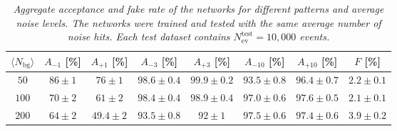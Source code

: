 \begingroup

\renewcommand{\arraystretch}{1.5}
\begin{table}[h]
\centering
\small
\begin{tabular}{cccccccc}
\toprule
\textbf{$\langle{N_{\text{bg}}}\rangle$} & 
\textbf{$A_{-1}$ [\%]} & 
\textbf{$A_{+1}$ [\%]} & 
\textbf{$A_{-3}$ [\%]} & 
\textbf{$A_{+3}$ [\%]} & 
\textbf{$A_{-10}$ [\%]} & 
\textbf{$A_{+10}$ [\%]} & 
\textbf{$F$ [\%]} \\
\midrule
$50$  & $86 \pm 1$   & $76 \pm 1$   & $98.6 \pm 0.4$ & $99.9 \pm 0.2$ & $93.5 \pm 0.8$ & $96.4 \pm 0.7$ & $2.2 \pm 0.1$ \\
$100$ & $70 \pm 2$   & $61 \pm 2$   & $98.4 \pm 0.4$ & $98.9 \pm 0.4$ & $97.0 \pm 0.6$ & $97.6 \pm 0.5$ & $2.1 \pm 0.1$ \\
$200$ & $64 \pm 2$   & $49.4 \pm 2$ & $93.5 \pm 0.8$ & $92 \pm 1$     & $97.5 \pm 0.6$ & $97.4 \pm 0.6$ & $3.9 \pm 0.2$ \\
\bottomrule
\end{tabular}
\vspace{3mm}
\caption{\emph{Aggregate acceptance and fake rate of the networks for different patterns and average noise levels. The networks were trained and tested with the same average number of noise hits. Each test dataset contains $N_{\text{ev}}^{\text{test}} = 10,000$ events.}}
\label{tab:aggregate_results_thesis}
\end{table}
\endgroup